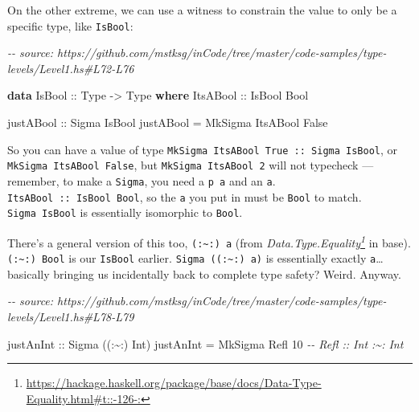 \documentclass[]{article}
\newenvironment{Shaded}{}{}
\newcommand{\CommentTok}[1]{\textcolor[rgb]{0.38,0.63,0.69}{\textit{#1}}}
\newcommand{\DataTypeTok}[1]{\textcolor[rgb]{0.56,0.13,0.00}{#1}}
\newcommand{\DecValTok}[1]{\textcolor[rgb]{0.25,0.63,0.44}{#1}}
\newcommand{\KeywordTok}[1]{\textcolor[rgb]{0.00,0.44,0.13}{\textbf{#1}}}
\newcommand{\NormalTok}[1]{#1}
\newcommand{\OperatorTok}[1]{\textcolor[rgb]{0.40,0.40,0.40}{#1}}
\newcommand{\OtherTok}[1]{\textcolor[rgb]{0.00,0.44,0.13}{#1}}
\renewcommand{\href}[2]{#2\footnote{\url{#1}}}
\begin{document}
On the other extreme, we can use a witness to constrain the value to only be a
specific type, like \texttt{IsBool}:

\begin{Shaded}
\begin{Highlighting}[]
\CommentTok{{-}{-} source: https://github.com/mstksg/inCode/tree/master/code{-}samples/type{-}levels/Level1.hs\#L72{-}L76}

\KeywordTok{data} \DataTypeTok{IsBool}\OtherTok{ ::} \DataTypeTok{Type} \OtherTok{{-}\textgreater{}} \DataTypeTok{Type} \KeywordTok{where}
  \DataTypeTok{ItsABool}\OtherTok{ ::} \DataTypeTok{IsBool} \DataTypeTok{Bool}

\OtherTok{justABool ::} \DataTypeTok{Sigma} \DataTypeTok{IsBool}
\NormalTok{justABool }\OtherTok{=} \DataTypeTok{MkSigma} \DataTypeTok{ItsABool} \DataTypeTok{False}
\end{Highlighting}
\end{Shaded}

So you can have a value of type
\texttt{MkSigma\ ItsABool\ True\ ::\ Sigma\ IsBool}, or
\texttt{MkSigma\ ItsABool\ False}, but \texttt{MkSigma\ ItsABool\ 2} will not
typecheck --- remember, to make a \texttt{Sigma}, you need a \texttt{p\ a} and
an \texttt{a}. \texttt{ItsABool\ ::\ IsBool\ Bool}, so the \texttt{a} you put in
must be \texttt{Bool} to match. \texttt{Sigma\ IsBool} is essentially isomorphic
to \texttt{Bool}.

There's a general version of this too, \texttt{(:\textasciitilde{}:)\ a} (from
\emph{\href{https://hackage.haskell.org/package/base/docs/Data-Type-Equality.html\#t::-126-:}{Data.Type.Equality}}
in base). \texttt{(:\textasciitilde{}:)\ Bool} is our \texttt{IsBool} earlier.
\texttt{Sigma\ ((:\textasciitilde{}:)\ a)} is essentially exactly
\texttt{a}\ldots basically bringing us incidentally back to complete type
safety? Weird. Anyway.

\begin{Shaded}
\begin{Highlighting}[]
\CommentTok{{-}{-} source: https://github.com/mstksg/inCode/tree/master/code{-}samples/type{-}levels/Level1.hs\#L78{-}L79}

\OtherTok{justAnInt ::} \DataTypeTok{Sigma}\NormalTok{ ((}\OperatorTok{:\textasciitilde{}:}\NormalTok{) }\DataTypeTok{Int}\NormalTok{)}
\NormalTok{justAnInt }\OtherTok{=} \DataTypeTok{MkSigma} \DataTypeTok{Refl} \DecValTok{10} \CommentTok{{-}{-} Refl :: Int :\textasciitilde{}: Int}
\end{Highlighting}
\end{Shaded}
\end{document}
